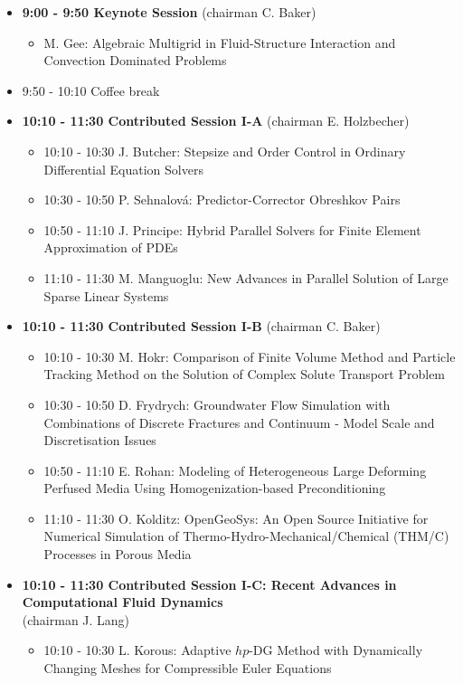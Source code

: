 \documentclass[10pt, A4]{article}%
\begin{document}
\begin{itemize}    
  \item {\bf 9:00 - 9:50 Keynote Session} (chairman C. Baker) 
  \begin{itemize}
    \item M. Gee: Algebraic Multigrid in Fluid-Structure Interaction and Convection Dominated Problems
  \end{itemize}
  \item 9:50 - 10:10 Coffee break
  \item {\bf 10:10 - 11:30 Contributed Session I-A} (chairman E. Holzbecher) 
  \begin{itemize}
    \item 10:10 - 10:30 J. Butcher: Stepsize and Order Control in Ordinary Differential Equation Solvers
    \item 10:30 - 10:50 P. Sehnalov\'{a}: Predictor-Corrector Obreshkov Pairs
    \item 10:50 - 11:10 J. Principe: Hybrid Parallel Solvers for Finite Element Approximation of PDEs
    \item 11:10 - 11:30 M. Manguoglu: New Advances in Parallel Solution of Large Sparse Linear Systems
  \end{itemize}
  \item {\bf 10:10 - 11:30 Contributed Session I-B} (chairman C. Baker) 
  \begin{itemize}
    \item 10:10 - 10:30 M. Hokr: Comparison of Finite Volume Method and Particle Tracking Method on the Solution of Complex Solute Transport Problem
    \item 10:30 - 10:50 D. Frydrych: Groundwater Flow Simulation with Combinations of Discrete Fractures and Continuum - Model Scale and Discretisation Issues
    \item 10:50 - 11:10 E. Rohan: Modeling of Heterogeneous Large Deforming Perfused Media Using Homogenization-based Preconditioning
    \item 11:10 - 11:30 O. Kolditz: OpenGeoSys: An Open Source Initiative for Numerical Simulation of Thermo-Hydro-Mechanical/Chemical (THM/C) Processes in Porous Media
  \end{itemize}
  \item {\bf 10:10 - 11:30 Contributed Session I-C: Recent Advances in Computational Fluid Dynamics} \\(chairman J. Lang) 
  \begin{itemize}
    \item 10:10 - 10:30 L. Korous: Adaptive $hp$-DG Method with Dynamically Changing Meshes for Compressible Euler Equations

\end{itemize}
\end{itemize}
\end{document}
